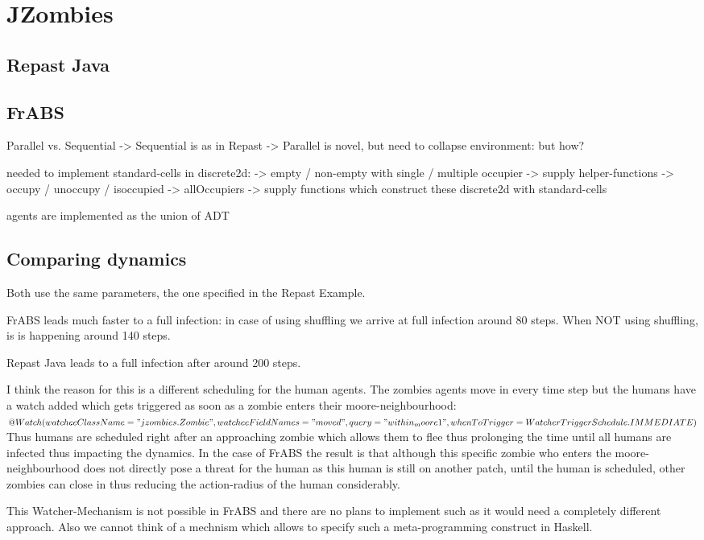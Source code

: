 \section{JZombies}

\subsection{Repast Java}

\subsection{FrABS}
Parallel vs. Sequential
	-> Sequential is as in Repast
	-> Parallel is novel, but need to collapse environment: but how?

needed to implement standard-cells in discrete2d:
	-> empty / non-empty with single / multiple occupier
	-> supply helper-functions
		-> occupy / unoccupy / isoccupied
		-> allOccupiers
	-> supply functions which construct these discrete2d with standard-cells

agents are implemented as the union of ADT

\subsection{Comparing dynamics}
Both use the same parameters, the one specified in the Repast Example.

FrABS leads much faster to a full infection: in case of using shuffling we arrive at full infection around 80 steps. When NOT using shuffling, is is happening around 140 steps.

Repast Java leads to a full infection after around 200 steps.

I think the reason for this is a different scheduling for the human agents. The zombies agents move in every time step but the humans have a watch added which gets triggered as soon as a zombie enters their moore-neighbourhood:
$
		@Watch(watcheeClassName = "jzombies.Zombie", 
			watcheeFieldNames = "moved",
			query = "within_moore 1", 
			whenToTrigger = WatcherTriggerSchedule.IMMEDIATE)$
Thus humans are scheduled right after an approaching zombie which allows them to flee thus prolonging the time until all humans are infected thus impacting the dynamics. In the case of FrABS the result is that although this specific zombie who enters the moore-neighbourhood does not directly pose a threat for the human as this human is still on another patch, until the human is scheduled, other zombies can close in thus reducing the action-radius of the human considerably.

This Watcher-Mechanism is not possible in FrABS and there are no plans to implement such as it would need a completely different approach. Also we cannot think of a mechnism which allows to specify such a meta-programming construct in Haskell.